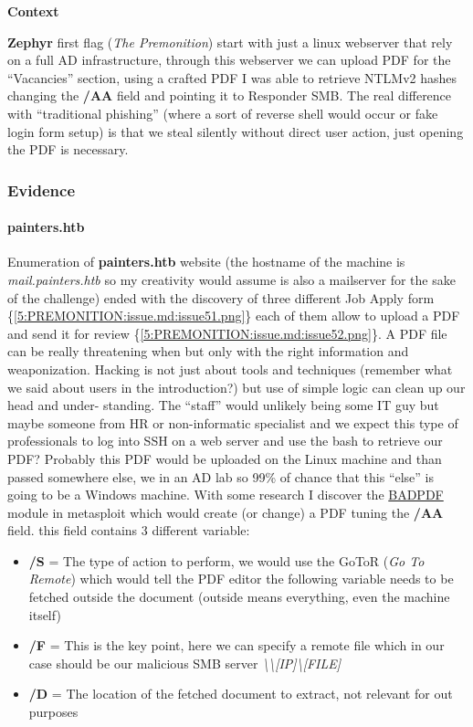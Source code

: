 \documentclass[a4paper]{article}
\def\tightlist{}
\begin{document}
\textbf{Context}

\textbf{Zephyr} first flag (\emph{The Premonition}) start with just a linux webserver that rely on a full AD infrastructure, through this webserver we can upload PDF for the ``Vacancies'' section, using a crafted
PDF I was able to retrieve NTLMv2 hashes changing the \textbf{/AA} field and pointing it to Responder SMB. The real difference with ``traditional phishing'' (where a sort of reverse shell would occur or fake login form setup)
is that we steal silently without direct user action, just opening the PDF is necessary.


    \subsubsection{Evidence}

          \paragraph{painters.htb}

      Enumeration of \textbf{painters.htb} website (the hostname of the machine is \emph{mail.painters.htb} so my creativity would assume is also a mailserver for the sake of the challenge) ended with the discovery of three different Job Apply form \{\ref{5:PREMONITION:issue.md:issue51.png}\} each of them allow to upload a PDF and send it for review \{\ref{5:PREMONITION:issue.md:issue52.png}\}.
A PDF file can be really threatening when but only with the right information and weaponization. Hacking is not just about tools and techniques (remember what we said about users in the introduction?) but use of simple logic can clean up our head and under-
standing. The ``staff'' would unlikely being some IT guy but maybe someone from HR or non-informatic specialist and we expect this type of professionals to log into SSH on a web
server and use the bash to retrieve our PDF? Probably this PDF would be uploaded on the Linux machine and than passed somewhere else, we in an AD lab so 99\% of chance that
this ``else'' is going to be a Windows machine. With some research I discover the \href{https://www.infosecmatter.com/metasploit-module-library/?mm=auxiliary/fileformat/badpdf}{BADPDF} module in metasploit which would
create (or change) a PDF tuning the \textbf{/AA} field. this field contains 3 different variable:

\begin{itemize}
\tightlist
\item
  \textbf{/S} = The type of action to perform, we would use the GoToR (\emph{Go To Remote}) which would tell the PDF editor the following variable needs to be fetched outside the document (outside means everything, even the machine itself)
\item
  \textbf{/F} = This is the key point, here we can specify a remote file which in our case should be our malicious SMB server \emph{\textbackslash\textbackslash{[}IP{]}\textbackslash{[}FILE{]}}
\item
  \textbf{/D} = The location of the fetched document to extract, not relevant for out purposes
\end{itemize}
\end{document}
